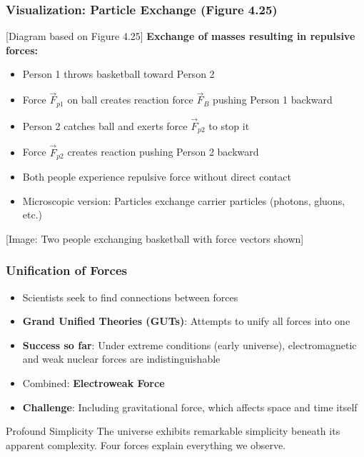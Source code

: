 \documentclass{beamer}
\begin{document}
\begin{frame}
\frametitle{Visualization: Particle Exchange (Figure 4.25)}
\begin{alertblock}{[Diagram based on Figure 4.25]}
\textbf{Exchange of masses resulting in repulsive forces:}
\begin{itemize}
    \item Person 1 throws basketball toward Person 2
    \item Force $\vec{F}_{p1}$ on ball creates reaction force $\vec{F}_B$ pushing Person 1 backward
    \item Person 2 catches ball and exerts force $\vec{F}_{p2}$ to stop it
    \item Force $\vec{F}_{p2}$ creates reaction pushing Person 2 backward
    \item Both people experience repulsive force without direct contact
    \item Microscopic version: Particles exchange carrier particles (photons, gluons, etc.)
\end{itemize}
\alert{[Image: Two people exchanging basketball with force vectors shown]}
\end{alertblock}
\end{frame}

\begin{frame}
\frametitle{Unification of Forces}
\begin{itemize}
    \item Scientists seek to find connections between forces \pause
    \item \textbf{Grand Unified Theories (GUTs)}: Attempts to unify all forces into one \pause
    \item \textbf{Success so far}: Under extreme conditions (early universe), electromagnetic and weak nuclear forces are indistinguishable \pause
    \item Combined: \textbf{Electroweak Force} \pause
    \item \textbf{Challenge}: Including gravitational force, which affects space and time itself
\end{itemize}
\pause
\begin{alertblock}{Profound Simplicity}
The universe exhibits remarkable simplicity beneath its apparent complexity. Four forces explain everything we observe.
\end{alertblock}
\end{frame}
\end{document}

